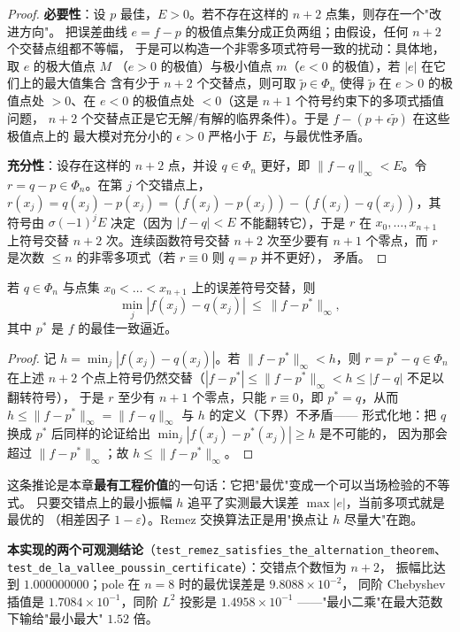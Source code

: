 \begin{proof}
\textbf{必要性}：设 $p$ 最佳，$E>0$。若不存在这样的 $n+2$ 点集，则存在一个"改进方向"。
把误差曲线 $e=f-p$ 的极值点集分成正负两组；由假设，任何 $n+2$ 个交替点组都不等幅，
于是可以构造一个非零多项式符号一致的扰动：具体地，取 $e$ 的极大值点 $M$
（$e>0$ 的极值）与极小值点 $m$（$e<0$ 的极值），若 $|e|$ 在它们上的最大值集合
含有少于 $n+2$ 个交替点，则可取 $\tilde p\in\Phi_n$ 使得 $\tilde p$ 在 $e>0$
的极值点处 $>0$、在 $e<0$ 的极值点处 $<0$（这是 $n+1$ 个符号约束下的多项式插值问题，
$n+2$ 个交替点正是它无解/有解的临界条件）。于是 $f-(p+\epsilon\tilde p)$ 在这些极值点上的
最大模对充分小的 $\epsilon>0$ 严格小于 $E$，与最优性矛盾。

\textbf{充分性}：设存在这样的 $n+2$ 点，并设 $q\in\Phi_n$ 更好，即
$\|f-q\|_\infty<E$。令 $r=q-p\in\Phi_n$。在第 $j$ 个交错点上，
$r(x_j)=q(x_j)-p(x_j)=(f(x_j)-p(x_j))-(f(x_j)-q(x_j))$，其符号由
$\sigma(-1)^jE$ 决定（因为 $|f-q|<E$ 不能翻转它），于是 $r$ 在
$x_0,\dots,x_{n+1}$ 上符号交替 $n+2$ 次。连续函数符号交替 $n+2$ 次至少要有
$n+1$ 个零点，而 $r$ 是次数 $\le n$ 的非零多项式（若 $r\equiv0$ 则 $q=p$ 并不更好），
矛盾。
\end{proof}

\begin{corollary}
\label{cor:vdp}
若 $q\in\Phi_n$ 与点集 $x_0<\dots<x_{n+1}$ 上的误差符号交替，则
\[
  \min_j|f(x_j)-q(x_j)|\ \le\ \|f-p^*\|_\infty,
\]
其中 $p^*$ 是 $f$ 的最佳一致逼近。
\end{corollary}

\begin{proof}
记 $h=\min_j|f(x_j)-q(x_j)|$。若 $\|f-p^*\|_\infty<h$，则 $r=p^*-q\in\Phi_n$ 在上述
$n+2$ 个点上符号仍然交替（$|f-p^*|\le\|f-p^*\|_\infty<h\le|f-q|$ 不足以翻转符号），
于是 $r$ 至少有 $n+1$ 个零点，只能 $r\equiv0$，即 $p^*=q$，从而
$h\le\|f-p^*\|_\infty=\|f-q\|_\infty$ 与 $h$ 的定义（下界）不矛盾——
形式化地：把 $q$ 换成 $p^*$ 后同样的论证给出 $\min_j|f(x_j)-p^*(x_j)|\ge h$ 是不可能的，
因为那会超过 $\|f-p^*\|_\infty$；故 $h\le\|f-p^*\|_\infty$。
\end{proof}

这条推论是本章\textbf{最有工程价值}的一句话：它把"最优"变成一个可以当场检验的不等式。
只要交错点上的最小振幅 $h$ 追平了实测最大误差 $\max|e|$，当前多项式就是最优的
（相差因子 $1-\varepsilon$）。Remez 交换算法正是用"换点让 $h$ 尽量大"在跑。

\textbf{本实现的两个可观测结论}（\texttt{test\_remez\_satisfies\_the\_alternation\_theorem}、
\texttt{test\_de\_la\_vallee\_poussin\_certificate}）：交错点个数恒为 $n+2$，
振幅比达到 $1.000000000$；pole 在 $n=8$ 时的最优误差是 $9.8088\times10^{-2}$，
同阶 Chebyshev 插值是 $1.7084\times10^{-1}$，同阶 $L^2$ 投影是 $1.4958\times10^{-1}$
——"最小二乘"在最大范数下输给"最小最大" $1.52$ 倍。

